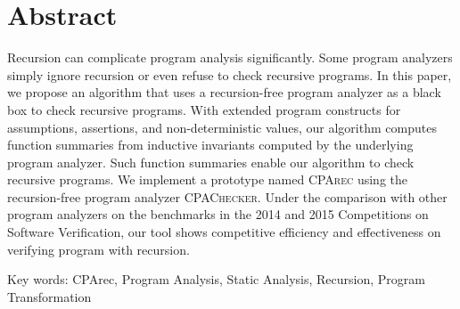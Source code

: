
\chapter{Abstract}

Recursion can complicate program analysis significantly.
Some program analyzers simply ignore recursion or even refuse to check recursive
programs.
In this paper, we propose an algorithm that uses a recursion-free program
analyzer as a black box to check recursive programs.
With extended program constructs for assumptions, assertions, and
non-deterministic values,
our algorithm computes function summaries from inductive invariants computed by
the underlying program analyzer.
Such function summaries enable our algorithm to check recursive programs.
We implement a prototype named \textsc{CPArec} using the recursion-free program
analyzer \textsc{CPAChecker}.
Under the comparison with other program analyzers on the benchmarks in the 2014
and 2015 Competitions on Software Verification,
our tool shows competitive efficiency and effectiveness on verifying program
with recursion.

Key words: CPArec, Program Analysis, Static Analysis, Recursion,
Program Transformation
